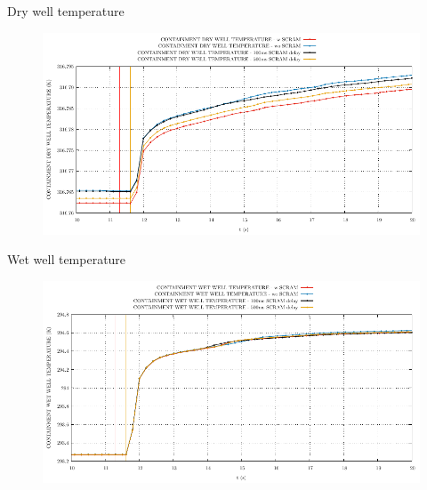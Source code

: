 \begin{frame}{Dry well temperature}
	\begin{figure}
		\centering
		\includegraphics[width=\textwidth]{./01PressureAccident/graphs/CONTAINMENT DRY WELL TEMPERATURE_comp.pdf}
		
	\end{figure}
	
\end{frame}
\begin{frame}{Wet well temperature}
	\begin{figure}
		\centering
		\includegraphics[width=\textwidth]{./01PressureAccident/graphs/CONTAINMENT WET WELL TEMPERATURE_comp.pdf}
		
	\end{figure}
	
\end{frame}



